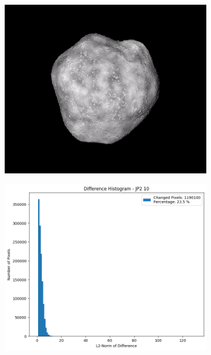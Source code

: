 \begin{figure}[htb]
    \centering
    \begin{subfigure}[b]{0.48\textwidth}
        \centering
        \includegraphics[width=\textwidth]{doc/thesis/0_figures/compare_quality/set1/jp2_10.png}
        \caption{}
        \label{fig:img_quality_comp_jp2_10_orig}
    \end{subfigure}
    \begin{subfigure}[b]{0.48\textwidth}
        \centering
        \includegraphics[width=\textwidth]{doc/thesis/0_figures/compare_quality/set1/jp2_10_diff_histogram.png}

\end{subfigure}
\end{figure}
